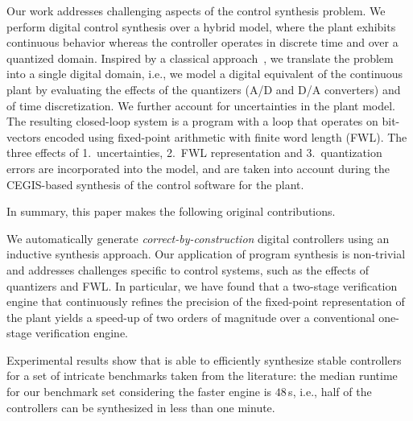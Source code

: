\documentclass[final]{sig-alternate-05-2015}
\begin{document}
Our work addresses challenging aspects of the control synthesis problem.  We
perform digital control synthesis over a hybrid model, where the plant
exhibits continuous behavior whereas the controller operates in discrete
time and over a quantized domain.  Inspired by a classical
approach~\cite{astrom1997computer}, we translate the problem into a single
digital domain, i.e., we model a digital equivalent of the continuous plant
by evaluating the effects of the quantizers (A/D and D/A converters) and of
time discretization.  We further account for uncertainties in the plant
model.  The resulting closed-loop system is a program with a loop that
operates on bit-vectors encoded using fixed-point arithmetic with finite
word length (FWL).  The three effects of 1.~uncertainties, 2.~FWL
representation and 3.~quantization errors are incorporated into the model,
and are taken into account during the CEGIS-based synthesis of the control
software for the plant.

In summary, this paper makes the following original contributions.
%
\begin{itemize*}

\item We automatically generate {\em correct-by-construction} digital
  controllers using an inductive synthesis approach.  Our application of program
  synthesis is non-trivial and addresses challenges specific to control
  systems, such as the effects of quantizers and FWL.  In particular, we
  have found that a two-stage verification engine that continuously refines
  the precision of the fixed-point representation of the plant yields a
  speed-up of two orders of magnitude over a conventional one-stage
  verification engine.

\item Experimental results show that \tool is able to efficiently synthesize
  stable controllers for a set of intricate benchmarks taken from the
  literature: the median runtime for our benchmark set considering the
  faster engine is $48$\,s, i.e., half of the controllers can be synthesized
  in less than one minute.



\end{itemize*}
\end{document}
